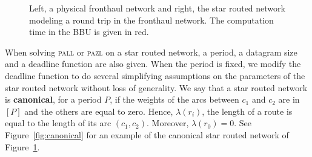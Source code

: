 \documentclass[a4paper,10pt]{journal}
\newcommand\pazl{\textsc{pazl}\xspace}
\newcommand\pall{\textsc{pall}\xspace}
\begin{document}
\begin{figure}
\begin{center}
{
}




             \caption{Left, a physical fronthaul network and right, the star routed network modeling a round trip in the fronthaul network. The computation time in the BBU is given in red.}

	         \label{fig:star}
            \end{center}
	         \end{figure}
	         
  When solving \pall or \pazl on a star routed network, a period, a datagram size and a deadline function are also given. When the period is fixed, we modify the deadline function to do several simplifying assumptions on the parameters of the star routed network without loss of generality. We say that a star routed network is \textbf{canonical}, for a period $P$, if the weights of the arcs between $c_1$ and $c_2$ are in $[P]$ and the others are equal to zero. Hence, $\lambda(r_i)$, the length of a route is equal to the length of its arc $(c_1,c_2)$. Moreover, $\lambda(r_0) = 0$. See Figure~\ref{fig:canonical} for an example of the canonical star routed network of Figure~\ref{fig:star}.  
  
\end{document}
